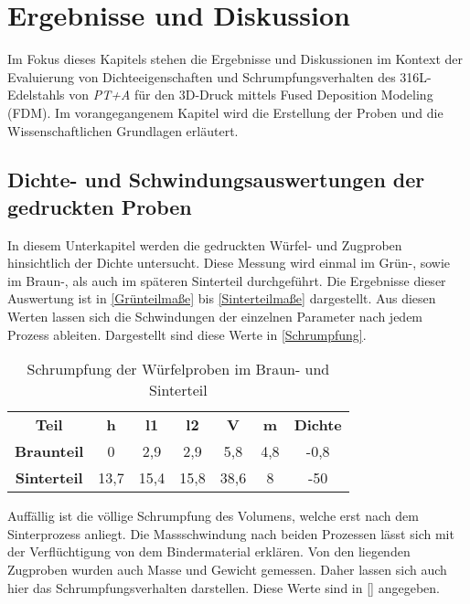 \chapter{Ergebnisse und Diskussion}

Im Fokus dieses Kapitels stehen die Ergebnisse und Diskussionen im Kontext der Evaluierung von Dichteeigenschaften und Schrumpfungsverhalten des 316L-Edelstahls von \textit{PT+A} für den 3D-Druck mittels Fused Deposition Modeling (FDM). Im vorangegangenem Kapitel wird die Erstellung der Proben und die Wissenschaftlichen Grundlagen erläutert.

\section{Dichte- und Schwindungsauswertungen der gedruckten Proben}

In diesem Unterkapitel werden die gedruckten Würfel- und Zugproben hinsichtlich der Dichte untersucht. Diese Messung wird einmal im Grün-, sowie im Braun-, als auch im späteren Sinterteil durchgeführt. Die Ergebnisse dieser Auswertung ist in \autoref{Grünteilmaße} bis \autoref{Sinterteilmaße} dargestellt.
Aus diesen Werten lassen sich die Schwindungen der einzelnen Parameter nach jedem Prozess ableiten. Dargestellt sind diese Werte in \autoref{Schrumpfung}.

\begin{table}[h]
    \centering
    \caption{Schrumpfung der Würfelproben im Braun- und Sinterteil}
      \begin{tabular}{ccccccc}
      \toprule
      \textbf{Teil} & \multicolumn{1}{c}{\textbf{h}} & \multicolumn{1}{c}{\textbf{l1}} & \multicolumn{1}{c}{\textbf{l2}} & \multicolumn{1}{c}{\textbf{V}} & \multicolumn{1}{c}{\textbf{m}} & \multicolumn{1}{c}{\textbf{Dichte}} \\
        \textbf{Braunteil} & 0 & 2,9 & 2,9 & 5,8 & 4,8 & -0,8 \\
        \textbf{Sinterteil} & 13,7 & 15,4 & 15,8 & 38,6 & 8 & -50 \\
      \bottomrule
      \end{tabular}%
    \label{Schrumpfung}%
  \end{table}%
  \FloatBarrier

Auffällig ist die völlige Schrumpfung des Volumens, welche erst nach dem Sinterprozess anliegt. Die Massschwindung nach beiden Prozessen lässt sich mit der Verflüchtigung von dem Bindermaterial erklären. 
Von den liegenden Zugproben wurden auch Masse und Gewicht gemessen. Daher lassen sich auch hier das Schrumpfungsverhalten darstellen. Diese Werte sind in \autoref{} angegeben.



